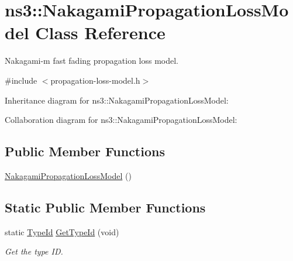 \hypertarget{classns3_1_1NakagamiPropagationLossModel}{}\section{ns3\+:\+:Nakagami\+Propagation\+Loss\+Model Class Reference}
\label{classns3_1_1NakagamiPropagationLossModel}


Nakagami-\/m fast fading propagation loss model.  




{\ttfamily \#include $<$propagation-\/loss-\/model.\+h$>$}



Inheritance diagram for ns3\+:\+:Nakagami\+Propagation\+Loss\+Model\+:


Collaboration diagram for ns3\+:\+:Nakagami\+Propagation\+Loss\+Model\+:
\subsection*{Public Member Functions}
\begin{DoxyCompactItemize}
\item 
\hyperlink{classns3_1_1NakagamiPropagationLossModel_a5d77ea9098f4f9a3b25d81d3e7699cd3}{Nakagami\+Propagation\+Loss\+Model} ()
\end{DoxyCompactItemize}
\subsection*{Static Public Member Functions}
\begin{DoxyCompactItemize}
\item 
static \hyperlink{classns3_1_1TypeId}{Type\+Id} \hyperlink{classns3_1_1NakagamiPropagationLossModel_a6e4460aa2dbe4899f8503ed35aa13e3b}{Get\+Type\+Id} (void)
\begin{DoxyCompactList}\small\item\em Get the type ID. \end{DoxyCompactList}\end{DoxyCompactItemize}
